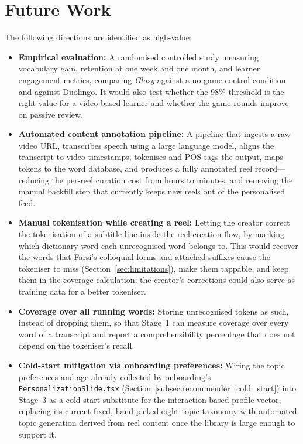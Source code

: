 \section{Future Work}
\label{sec:future_work}
    The following directions are identified as high-value:
    \begin{sloppypar}
    \begin{itemize}
        \item \textbf{Empirical evaluation:} A randomised controlled study measuring vocabulary gain, retention at one week and one month, and learner engagement metrics, comparing \textit{Glosy} against a no-game control condition and against Duolingo. It would also test whether the 98\% threshold is the right value for a video-based learner and whether the game rounds improve on passive review.
        \item \textbf{Automated content annotation pipeline:} A pipeline that ingests a raw video URL, transcribes speech using a large language model, aligns the transcript to video timestamps, tokenises and POS-tags the output, maps tokens to the word database, and produces a fully annotated reel record---reducing the per-reel curation cost from hours to minutes, and removing the manual backfill step that currently keeps new reels out of the personalised feed.
        \item \textbf{Manual tokenisation while creating a reel:} Letting the creator correct the tokenisation of a subtitle line inside the reel-creation flow, by marking which dictionary word each unrecognised word belongs to. This would recover the words that Farsi's colloquial forms and attached suffixes cause the tokeniser to miss (Section~\ref{sec:limitations}), make them tappable, and keep them in the coverage calculation; the creator's corrections could also serve as training data for a better tokeniser.
        \item \textbf{Coverage over all running words:} Storing unrecognised tokens as such, instead of dropping them, so that Stage~1 can measure coverage over every word of a transcript and report a comprehensibility percentage that does not depend on the tokeniser's recall.
        \item \textbf{Cold-start mitigation via onboarding preferences:} Wiring the topic preferences and age already collected by onboarding's \texttt{PersonalizationSlide.tsx} (Section~\ref{subsec:recommender_cold_start}) into Stage~3 as a cold-start substitute for the interaction-based profile vector, replacing its current fixed, hand-picked eight-topic taxonomy with automated topic generation derived from reel content once the library is large enough to support it.

\end{itemize}
\end{sloppypar}
